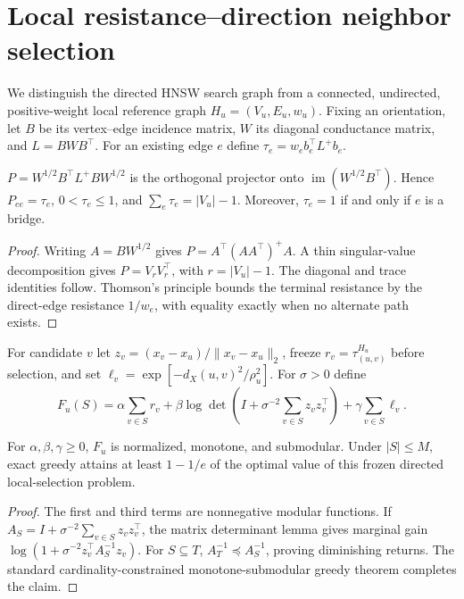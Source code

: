 \section{Local resistance--direction neighbor selection}
\label{sec:theory}

We distinguish the directed HNSW search graph from a connected, undirected,
positive-weight local reference graph $H_u=(V_u,E_u,w_u)$.  Fixing an
orientation, let $B$ be its vertex--edge incidence matrix, $W$ its diagonal
conductance matrix, and $L=BWB^\top$.  For an existing edge $e$ define
$\tau_e=w_e b_e^\top L^+b_e$.

\begin{proposition}
$P=W^{1/2}B^\top L^+BW^{1/2}$ is the orthogonal projector onto
$\operatorname{im}(W^{1/2}B^\top)$. Hence $P_{ee}=\tau_e$,
$0<\tau_e\le 1$, and $\sum_e\tau_e=|V_u|-1$. Moreover, $\tau_e=1$ if and
only if $e$ is a bridge.
\end{proposition}
\begin{proof}
Writing $A=BW^{1/2}$ gives $P=A^\top(AA^\top)^+A$. A thin singular-value
decomposition gives $P=V_rV_r^\top$, with $r=|V_u|-1$.  The diagonal and
trace identities follow.  Thomson's principle bounds the terminal
resistance by the direct-edge resistance $1/w_e$, with equality exactly
when no alternate path exists.
\end{proof}

For candidate $v$ let $z_v=(x_v-x_u)/\|x_v-x_u\|_2$, freeze
$r_v=\tau_{(u,v)}^{H_u}$ before selection, and set
$\ell_v=\exp[-d_X(u,v)^2/\rho_u^2]$.  For $\sigma>0$ define
\begin{equation}
 F_u(S)=\alpha\sum_{v\in S}r_v+
 \beta\log\det\!\left(I+\sigma^{-2}\sum_{v\in S}z_vz_v^\top\right)+
 \gamma\sum_{v\in S}\ell_v .
\end{equation}

\begin{proposition}
For $\alpha,\beta,\gamma\ge0$, $F_u$ is normalized, monotone, and
submodular. Under $|S|\le M$, exact greedy attains at least $1-1/e$ of the
optimal value of this frozen directed local-selection problem.
\end{proposition}
\begin{proof}
The first and third terms are nonnegative modular functions. If
$A_S=I+\sigma^{-2}\sum_{v\in S}z_vz_v^\top$, the matrix determinant lemma
gives marginal gain
$\log(1+\sigma^{-2}z_v^\top A_S^{-1}z_v)$. For $S\subseteq T$,
$A_T^{-1}\preceq A_S^{-1}$, proving diminishing returns. The standard
cardinality-constrained monotone-submodular greedy theorem completes the
claim.
\end{proof}

